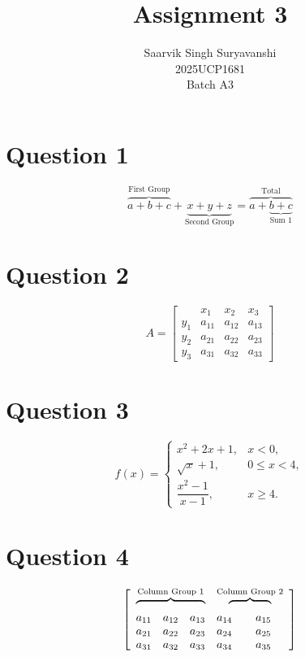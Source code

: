 \documentclass[12pt,a4paper]{article}
\title{Assignment 3}
\author{
	Saarvik Singh Suryavanshi \\
	2025UCP1681 \\
	Batch A3
}
\date{}
\begin{document}
	
	\maketitle
	
	\section*{Question 1}
	
	\[
	\overbrace{a+b+c}^{\text{First Group}}
	+
	\underbrace{x+y+z}_{\text{Second Group}}
	=
	\overbrace{
		a+\underbrace{b+c}_{\text{Sum 1}}
	}^{\text{Total}}
	\]
	
	\section*{Question 2}
	
	\[
	A =
	\left[
	\begin{array}{c|ccc}
		& x_1   & x_2   & x_3   \\ \hline
		y_1   & a_{11} & a_{12} & a_{13} \\
		y_2   & a_{21} & a_{22} & a_{23} \\
		y_3   & a_{31} & a_{32} & a_{33}
	\end{array}
	\right]
	\]
	
	\section*{Question 3}
	
	\[
	f(x) =
	\begin{cases}
		x^2 + 2x + 1, & x < 0, \\
		\sqrt{x} + 1, & 0 \leq x < 4, \\
		\dfrac{x^2 - 1}{x - 1}, & x \geq 4.
	\end{cases}
	\]
	
	\section*{Question 4}
	
	\[
	\left[
	\begin{array}{ccccc}
		\multicolumn{3}{c}{
			\overbrace{\phantom{a_{11}\quad a_{12}\quad a_{13}}}
			^{\text{Column Group 1}}
		}
		&
		\multicolumn{2}{c}{
			\overbrace{\phantom{a_{14}\quad a_{15}}}
			^{\text{Column Group 2}}
		}
		\\[-2pt]
		a_{11} & a_{12} & a_{13} & a_{14} & a_{15} \\
		a_{21} & a_{22} & a_{23} & a_{24} & a_{25} \\
		a_{31} & a_{32} & a_{33} & a_{34} & a_{35}
	\end{array}
	\right]
	\]
	
\end{document}
